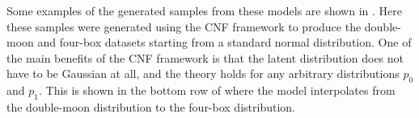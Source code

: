 \begin{table}[h!]
    \centering
    \caption{Hyperparameters used in the different diffusion frameworks.}
    \label{tab:diffusion_frameworks}
\end{table}

Some examples of the generated samples from these models are shown in .
Here these samples were generated using the CNF framework to produce the double-moon and four-box datasets starting from a standard normal distribution.
One of the main benefits of the CNF framework is that the latent distribution does not have to be Gaussian at all, and the theory holds for any arbitrary distributions $p_0$ and $p_1$.
This is shown in the bottom row of  where the model interpolates from the double-moon distribution to the four-box distribution.

